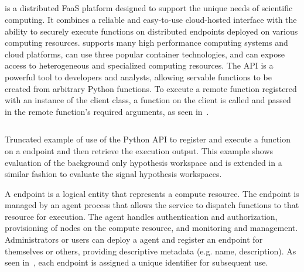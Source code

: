 \subsection{\funcX{}}\label{subsec:funcX}
\funcX{} is a distributed FaaS platform designed to support the unique needs of scientific computing.
It combines a reliable and easy-to-use cloud-hosted interface with the ability to securely execute functions on distributed endpoints deployed on various computing resources.
\funcX{} supports many high performance computing systems and cloud platforms, can use three popular container technologies, and can expose access to heterogeneous and specialized computing resources.
The \funcX{} API is a powerful tool to developers and analysts, allowing servable functions to be created from arbitrary Python functions.
To execute a remote function registered with an instance of the \funcX{} client class, a function on the \funcX{} client is called and passed in the remote function's required arguments, as seen in~.

\begin{listing}
 \inputminted{python}{src/code/funcX_registration_example.py}
 \caption{Truncated example of use of the \funcX{} Python API to register and execute a \pyhf{} function on a \funcX{} endpoint and then retrieve the execution output.
 This example shows evaluation of the background only hypothesis workspace and is extended in a similar fashion to evaluate the signal hypothesis workspaces.}
 \label{lst:funcX_registration_example}
\end{listing}

A \funcX{} endpoint is a logical entity that represents a compute resource.
The endpoint is managed by an agent process that allows the \funcX{} service to dispatch functions to that resource for execution.
The agent handles authentication and authorization, provisioning of nodes on the compute resource, and monitoring and management.
Administrators or users can deploy a \funcX{} agent and register an endpoint for themselves or others, providing descriptive  metadata (e.g. name, description).
As seen in~, each endpoint is assigned a unique identifier for subsequent use.\\

